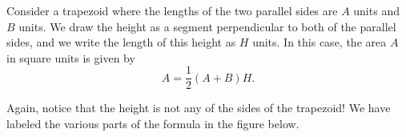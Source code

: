 \documentclass{ximera}
\begin{document}
\begin{theorem}
Consider a trapezoid where the lengths of the two parallel sides are $A$ units and $B$ units. We draw the height as a segment perpendicular to both of the parallel sides, and we write the length of this height as $H$ units. In this case, the area $A$ in square units is given by
\[
A = \frac12 (A+B)H.
\]
\end{theorem}
Again, notice that the height is not any of the sides of the trapezoid! We have labeled the various parts of the formula in the figure below.
\begin{image}
\end{image}
\end{document}
